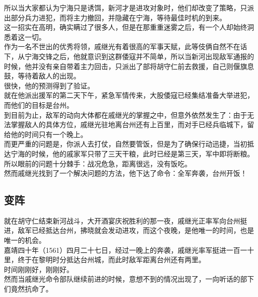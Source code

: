 \begin{multicols}{\theparacolNo}
所以当大家都认为宁海只是诱饵，新河才是进攻对象时，他们却改变了策略，只派出部分兵力进犯，而将主力撤回，并隐藏在宁海，等待最佳时机的到来。\\

这一招实在高明，确实瞒过了很多人，但是在那重重迷雾之后，有一个人却始终洞悉着这一切。\\

作为一名不世出的优秀将领，戚继光有着很高的军事天赋，此等伎俩自然不在话下，从宁海交锋之后，他就意识到这群倭寇并不简单，所以当新河出现敌军通报的时候，他并没有亲自带着主力回击，只派出了部将胡守仁前去救援，自己则偃旗息鼓，等待着敌人的出现。\\

很快，他的预测得到了验证。\\

就在他派出援军的第二天下午，紧急军情传来，大股倭寇已经集结准备大举进犯，而他们的目标是台州。\\

到目前为止，敌军的动向大体都在戚继光的掌握之中，但意外依然发生了：由于无法掌握敌人的具体方位，戚继光驻地离台州还有上百里，而对手已经兵临城下，留给他的时间只有一个晚上。\\

而更严重的问题是，你派人去打仗，自然要管饭，但是为了确保行动迅捷，当初抵达宁海的时候，他的戚家军只带了三天干粮，此时已经是第三天，军中即将断粮。\\

所以眼前的问题十分棘手：战况危急，距离很远，没有饭吃。\\

然而戚继光找到了一个解决问题的方法，他下达了命令：全军奔袭，台州开饭！\\

\subsection{变阵}
就在胡守仁结束新河战斗，大开酒宴庆祝胜利的那一夜，戚继光正率军向台州挺进，敌军已经抵达台州，拂晓就会发动进攻，而这个夜晚，是他唯一的时间，也是唯一的机会。\\

嘉靖四十年（1561）四月二十七日，经过一晚上的奔袭，戚继光率军挺进一百一十里，终于在黎明时分抵达台州城，而此时敌军距离台州还有两里。\\

时间刚刚好，刚刚好。\\

然而当戚继光命令部队继续前进的时候，意想不到的情况出现了，一向听话的部下们竟然抗命了。\\


\end{multicols}
